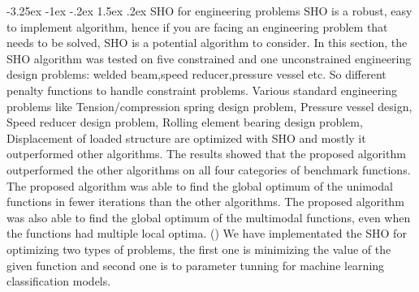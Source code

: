 \documentclass[12pt]{article}
\makeatletter
\renewcommand\subsection{\@startsection {subsection}{2}{1em}%
                                   {-3.25ex \@plus -1ex \@minus -.2ex}%
                                   {1.5ex \@plus .2ex}%
                                   {\normalfont\fontsize{12}{14}\bfseries}}
\makeatother
\begin{document}
\subsection{SHO for engineering problems}
SHO is a robust, easy to implement algorithm, hence if you are facing an engineering problem that needs to be solved, SHO is a potential algorithm to consider.
In this section, the SHO algorithm was tested on five constrained and one unconstrained engineering design problems: welded beam,speed reducer,pressure vessel etc.  So different penalty functions to handle constraint problems.
Various standard engineering problems like Tension/compression spring design problem, Pressure vessel design, Speed reducer design problem, Rolling element bearing design problem,  Displacement of loaded structure are optimized with SHO and mostly it outperformed other algorithms. 
The results showed that the proposed algorithm outperformed the other algorithms on all four categories of benchmark functions. The proposed algorithm was able to find the global optimum of the unimodal functions in fewer iterations than the other algorithms. The proposed algorithm was also able to find the global optimum of the multimodal functions, even when the functions had multiple local optima. (\cite{dhiman2017spotted,dhiman2018multi,dhiman2019spotted})
We have implementated the SHO for optimizing two types of problems, the first one is minimizing the value of the given function and second one is to parameter tunning for machine learning classification models.



\end{document}
